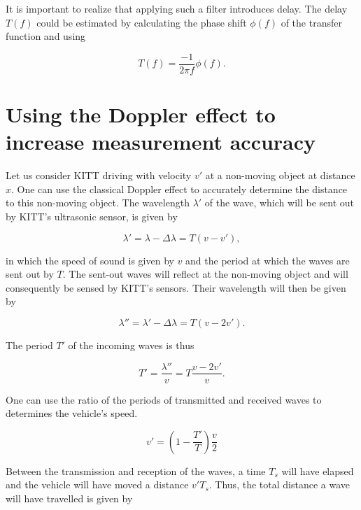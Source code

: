 \documentclass[11pt,titlepage]{report}
\begin{document}
\begin{appendices}
It is important to realize that applying such a filter introduces delay. The delay $T(f)$ could be estimated by calculating the phase shift $\phi(f)$ of the transfer function and using

\begin{equation}
	T(f) = \frac{-1}{2 \pi f} \phi(f).
\end{equation}

\chapter{Using the Doppler effect to increase measurement accuracy}
\label{app:doppler}
Let us consider KITT driving with velocity $v'$ at a non-moving object at distance $x$. One can use the classical Doppler effect to accurately determine the distance to this non-moving object. The wavelength $\lambda'$ of the wave, which will be sent out by KITT's ultrasonic sensor, is given by

\begin{equation}
	\lambda' = \lambda - \Delta \lambda = T (v - v'),
\end{equation}

in which the speed of sound is given by $v$ and the period at which the waves are sent out by $T$. The sent-out waves will reflect at the non-moving object and will consequently be sensed by KITT's sensors. Their wavelength will then be given by

\begin{equation}
	\lambda'' = \lambda' - \Delta \lambda = T (v - 2 v').
\end{equation}

The period $T'$ of the incoming waves is thus

\begin{equation}
	T' = \frac{\lambda''}{v} = T \frac{v - 2 v'}{v}.
\end{equation}

One can use the ratio of the periods of transmitted and received waves to determines the vehicle's speed.

\begin{equation} \label{eq:ass-2-vel-car}
 	v' = \left(1-\frac{T'}{T} \right) \frac{v}{2}
 \end{equation}

Between the transmission and reception of the waves, a time $T_s$ will have elapsed and the vehicle will have moved a distance $v' T_s$. Thus, the total distance a wave will have travelled is given by


\end{appendices}
\end{document}
